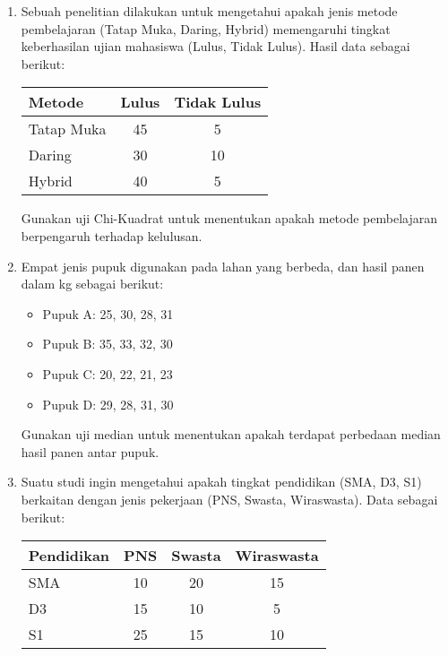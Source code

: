 \documentclass[12pt]{article}
\begin{document}
	\begin{enumerate}
		\item Sebuah penelitian dilakukan untuk mengetahui apakah jenis metode pembelajaran (Tatap Muka, Daring, Hybrid) memengaruhi tingkat keberhasilan ujian mahasiswa (Lulus, Tidak Lulus). Hasil data sebagai berikut:
		
		\begin{center}
			\begin{tabular}{lcc}
				\toprule
				Metode & Lulus & Tidak Lulus \\
				\midrule
				Tatap Muka & 45 & 5 \\
				Daring & 30 & 10 \\
				Hybrid & 40 & 5 \\
				\bottomrule
			\end{tabular}
		\end{center}
		
		Gunakan uji Chi-Kuadrat untuk menentukan apakah metode pembelajaran berpengaruh terhadap kelulusan.
		
		\item Empat jenis pupuk digunakan pada lahan yang berbeda, dan hasil panen dalam kg sebagai berikut:
		
		\begin{itemize}
			\item Pupuk A: 25, 30, 28, 31
			\item Pupuk B: 35, 33, 32, 30
			\item Pupuk C: 20, 22, 21, 23
			\item Pupuk D: 29, 28, 31, 30
		\end{itemize}
		
		Gunakan uji median untuk menentukan apakah terdapat perbedaan median hasil panen antar pupuk.
		
		\item Suatu studi ingin mengetahui apakah tingkat pendidikan (SMA, D3, S1) berkaitan dengan jenis pekerjaan (PNS, Swasta, Wiraswasta). Data sebagai berikut:
		
		\begin{center}
			\begin{tabular}{lccc}
				\toprule
				Pendidikan & PNS & Swasta & Wiraswasta \\
				\midrule
				SMA & 10 & 20 & 15 \\
				D3 & 15 & 10 & 5 \\
				S1 & 25 & 15 & 10 \\
				\bottomrule
			\end{tabular}
		\end{center}
		

\end{enumerate}
\end{document}
